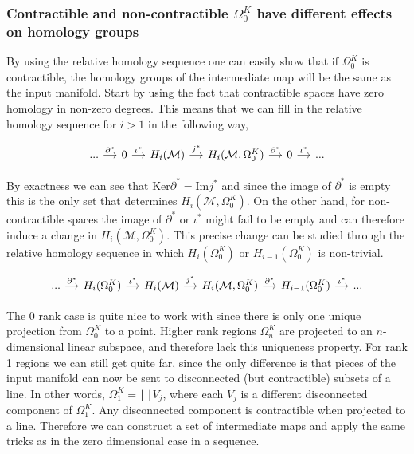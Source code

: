 \subsubsection*{Contractible and non-contractible $\Omega_0^K$ have different effects on homology groups}
By using the relative homology sequence one can easily show that if $\Omega_0^K$ is contractible, the homology groups of the intermediate map will be the same as the input manifold. Start by using the fact that contractible spaces have zero homology in non-zero degrees. This means that we can fill in the relative homology sequence for $i>1$ in the following way,

\begin{equation}
    \begin{tikzcd}[row sep=small,column sep=small]
        ... \arrow[r, "\partial^*"] & 0 \arrow[r, "\iota^*"] & H_i(\mathcal{M}) \arrow[r, "j^*"] & H_i(\mathcal{M},\Omega_0^K) \arrow[r, "\partial^*"] & 0 \arrow[r, "\iota^*"] & ...
    \end{tikzcd}
\end{equation}

By exactness we can see that $\text{Ker}\partial^*=\text{Im}j^*$ and since the image of $\partial^*$ is empty this is the only set that determines $H_i(\mathcal{M}, \Omega_0^K)$. On the other hand, for non-contractible spaces the image of $\partial^*$ or $\iota^*$ might fail to be empty and can therefore induce a change in $H_i(\mathcal{M}, \Omega^K_0)$. This precise change can be studied through the relative homology sequence in which $H_{i}(\Omega^K_0)$ or $H_{i-1}(\Omega^K_0)$ is non-trivial.

\begin{equation}
    \begin{tikzcd}[row sep=small,column sep=small]
        ... \arrow[r, "\partial^*"] & H_{i}(\Omega^K_0) \arrow[r, "\iota^*"] & H_i(\mathcal{M}) \arrow[r, "j^*"] & H_i(\mathcal{M},\Omega_0^K) \arrow[r, "\partial^*"] & H_{i-1}(\Omega^K_0) \arrow[r, "\iota^*"] & ...
    \end{tikzcd}
\end{equation}

The 0 rank case is quite nice to work with since there is only one unique projection from $\Omega_0^K$ to a point. Higher rank regions $\Omega^K_n$ are projected to an $n$-dimensional linear subspace, and therefore lack this uniqueness property. For rank 1 regions we can still get quite far, since the only difference is that pieces of the input manifold can now be sent to disconnected (but contractible) subsets of a line. In other words, $\Omega_1^K = \bigsqcup V_j$, where each $V_j$ is a different disconnected component of $\Omega_1^K$. Any disconnected component is contractible when projected to a line. Therefore we can construct a set of intermediate maps and apply the same tricks as in the zero dimensional case in a sequence.


